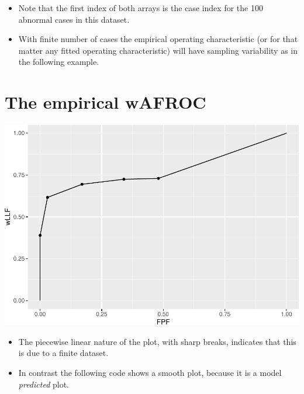 \documentclass[
]{book}
\newenvironment{Shaded}{\begin{snugshade}}{\end{snugshade}}
\newcommand{\DataTypeTok}[1]{\textcolor[rgb]{0.13,0.29,0.53}{#1}}
\newcommand{\KeywordTok}[1]{\textcolor[rgb]{0.13,0.29,0.53}{\textbf{#1}}}
\newcommand{\NormalTok}[1]{#1}
\newcommand{\OperatorTok}[1]{\textcolor[rgb]{0.81,0.36,0.00}{\textbf{#1}}}
\newcommand{\StringTok}[1]{\textcolor[rgb]{0.31,0.60,0.02}{#1}}
\providecommand{\tightlist}{%
  \setlength{\itemsep}{0pt}\setlength{\parskip}{0pt}}
\begin{document}
\begin{itemize}
\tightlist
\item
  Note that the first index of both arrays is the case index for the 100 abnormal cases in this dataset.
\item
  With finite number of cases the empirical operating characteristic (or for that matter any fitted operating characteristic) will have sampling variability as in the following example.
\end{itemize}

\hypertarget{the-empirical-wafroc}{%
\section{The empirical wAFROC}\label{the-empirical-wafroc}}

\begin{Shaded}
\end{Shaded}

\includegraphics{19-PlotRsmOpCh_files/figure-latex/unnamed-chunk-2-1.pdf}

\begin{itemize}
\tightlist
\item
  The piecewise linear nature of the plot, with sharp breaks, indicates that this is due to a finite dataset.
\item
  In contrast the following code shows a smooth plot, because it is a model \emph{predicted} plot.
\end{itemize}
\end{document}
